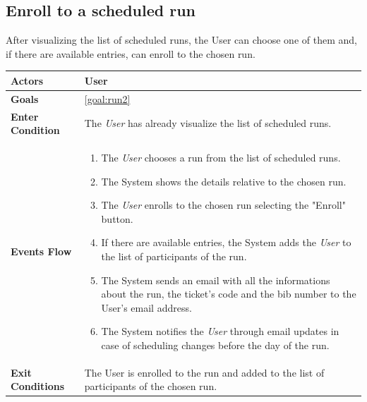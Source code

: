   \subsection{Enroll to a scheduled run}
After visualizing the list of scheduled runs, the User can choose one of them and, if there are available entries, can enroll to the chosen run. 

\begin{table}[H]
	\centering
    
    \begin{tabular}{|p{3.5cm}|p{10.3cm}|}
    
    \hline
    \textbf{\large{Actors}} & User	 \\		
    \hline
    \textbf{\large{Goals}} 				& \ref{goal:run2}\\
    
    \hline
    \textbf{\large{Enter Condition}}	& The \emph{User} has already visualize the list of scheduled runs.\\
    
    \hline
    \textbf{\large{Events Flow}}		& \begin{enumerate}[leftmargin=0.5cm]
                                          	\item The \emph{User} chooses a run from the list of scheduled runs. 
                                          	 \item The System shows the details relative to the chosen run.
                                            \item The \emph{User} enrolls to the chosen run selecting the "Enroll" button.
                                            \item If there are available entries, the System adds the \emph{User} to the list of participants of the run.
                                             \item The System sends an email with all the informations about the run, the ticket's code and the bib number to the User's email address.
                                              \item The System notifies the \emph{User} through email updates in case of scheduling changes before the day of the run.
                                             \end{enumerate}
    										\\
    \hline
    \textbf{\large{Exit Conditions}}    & The User is enrolled to the run and added to the list of participants of the chosen run.  \\
    

\end{tabular}
\end{table}
